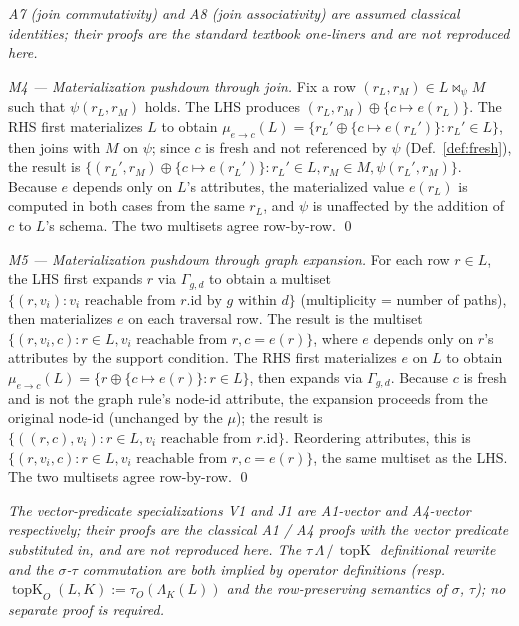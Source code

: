 \documentclass[acmsmall,review,anonymous]{acmart}
\theoremstyle{plain}
\theoremstyle{definition}
\newcommand{\topK}{\operatorname{topK}}
\theoremstyle{remark}
\begin{document}
\noindent\emph{A7 (join commutativity) and A8 (join associativity)
are assumed classical identities; their proofs are the standard
textbook one-liners and are not reproduced here.}

\begin{proof}[M4 --- Materialization pushdown through join]
Fix a row $(r_L, r_M) \in L \bowtie_\psi M$ such that $\psi(r_L, r_M)$
holds. The LHS produces $(r_L, r_M) \oplus \{c \mapsto e(r_L)\}$.
The RHS first materializes $L$ to obtain
$\mu_{e \to c}(L) = \{r_L' \oplus \{c \mapsto e(r_L')\} : r_L' \in L\}$,
then joins with $M$ on $\psi$; since $c$ is fresh and not referenced
by $\psi$ (Def.~\ref{def:fresh}), the result is
$\{ (r_L', r_M) \oplus \{c \mapsto e(r_L')\} : r_L' \in L, r_M \in M,
\psi(r_L', r_M) \}$. Because $e$ depends only on $L$'s attributes,
the materialized value $e(r_L)$ is computed in both cases from the
same $r_L$, and $\psi$ is unaffected by the addition of $c$ to $L$'s
schema. The two multisets agree row-by-row. \qed
\end{proof}

\begin{proof}[M5 --- Materialization pushdown through graph expansion]
For each row $r \in L$, the LHS first expands $r$ via
$\Gamma_{g,d}$ to obtain a multiset $\{(r, v_i) : v_i
\text{ reachable from } r\text{.id by } g \text{ within } d\}$
(multiplicity = number of paths), then materializes $e$ on each
traversal row. The result is the multiset $\{(r, v_i, c) : r
\in L, v_i \text{ reachable from } r, c = e(r)\}$, where $e$
depends only on $r$'s attributes by the support condition. The
RHS first materializes $e$ on $L$ to obtain
$\mu_{e \to c}(L) = \{r \oplus \{c \mapsto e(r)\} : r \in L\}$,
then expands via $\Gamma_{g,d}$. Because $c$ is fresh and is
not the graph rule's node-id attribute, the expansion
proceeds from the original node-id (unchanged by the $\mu$);
the result is $\{((r, c), v_i) : r \in L, v_i
\text{ reachable from } r\text{.id}\}$. Reordering attributes,
this is $\{(r, v_i, c) : r \in L, v_i \text{ reachable from }
r, c = e(r)\}$, the same multiset as the LHS. The two
multisets agree row-by-row. \qed
\end{proof}

\noindent\emph{The vector-predicate specializations V1 and J1 are
A1-vector and A4-vector respectively; their proofs are the
classical A1 / A4 proofs with the vector predicate substituted in,
and are not reproduced here. The $\tau\,\Lambda\,/\,\topK$
definitional rewrite and the $\sigma$-$\tau$ commutation are both
implied by operator definitions (resp.\ $\topK_O(L, K) :=
\tau_O(\Lambda_K(L))$ and the row-preserving semantics of
$\sigma$, $\tau$); no separate proof is required.}
\end{document}
